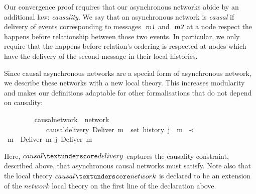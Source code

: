 \documentclass[acmlarge,review,anonymous]{acmart}\settopmatter{printfolios=true}
\begin{document}
Our convergence proof requires that our asynchronous networks abide by an additional law: \emph{causality}.
We say that an asynchronous network is \emph{causal} if delivery of events corresponding to messages $\isa{m1}$ and $\isa{m2}$ at a node respect the happens before relationship between those two events.
In particular, we only require that the happens before relation's ordering is respected at nodes which have the delivery of the second message in their local histories.

Since causal asynchronous networks are a special form of asynchronous network, we describe these networks with a new local theory.
This increases modularity and makes our definitions adaptable for other formalisations that do not depend on causality:
\\
\begin{isabellebody}
\ \ \ \ \ \ \ \  causal{\isacharunderscore}network\ {\isacharequal}\ network\ {\isacharplus}\isanewline
\ \ \ \ \ \ \ \ \ \ \ \ causal{\isacharunderscore}delivery{\isacharcolon}\ {\isachardoublequoteopen}Deliver\ m{}\ {\isasymin}\ set\ {\isacharparenleft}history\ j{\isacharparenright}\ {\isasymLongrightarrow}\ m{}\ $\prec$\ m{}\ {\isasymLongrightarrow}\ Deliver\ m{}\ {\isasymsqsubset}\isactrlsup j\ Deliver\ m{}{\isachardoublequoteclose}
\end{isabellebody}
\vspace{\baselineskip}
Here, $causal{\isacharunderscore}delivery$ captures the causality constraint, described above, that asynchronous causal networks must satisfy.
Note also that the local theory $causal{\isacharunderscore}network$ is declared to be an extension of the $network$ local theory on the first line of the declaration above.
\end{document}
